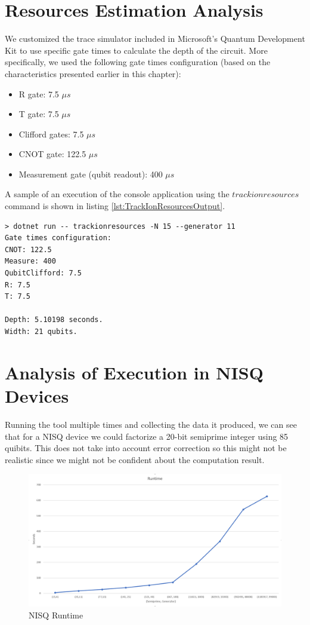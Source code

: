 \section{Resources Estimation Analysis}

We customized the trace simulator included in Microsoft's Quantum Development Kit to use specific gate times to calculate the depth of the circuit. More specifically, we used the following gate times configuration (based on the characteristics presented earlier in this chapter):
\begin{itemize}
    \item R gate: 7.5 $\mu s$
    \item T gate: 7.5 $\mu s$
    \item Clifford gates: 7.5 $\mu s$
    \item CNOT gate: 122.5 $\mu s$
    \item Measurement gate (qubit readout): 400 $\mu s$
\end{itemize}

A sample of an execution of the console application using the $trackionresources$ command is shown in listing \ref{lst:TrackIonResourcesOutput}.

\begin{lstlisting}[label=lst:TrackIonResourcesOutput,caption={Output of tracking Ion platform resources for Shor's algorithm}]
> dotnet run -- trackionresources -N 15 --generator 11
Gate times configuration:
CNOT: 122.5
Measure: 400
QubitClifford: 7.5
R: 7.5
T: 7.5

Depth: 5.10198 seconds.
Width: 21 qubits.
\end{lstlisting}

\section{Analysis of Execution in NISQ Devices}

Running the tool multiple times and collecting the data it produced, we can see that for a NISQ device we could factorize a 20-bit semiprime integer using 85 quibits. This does not take into account error correction so this might not be realistic since we might not be confident about the computation result.

\begin{figure}[h!]
    \centering
    \includegraphics[scale=.35]{images/TrappedIons-NisqRuntime.png}
    \caption{NISQ Runtime}
    \label{fig:NisqRuntime}
\end{figure}
